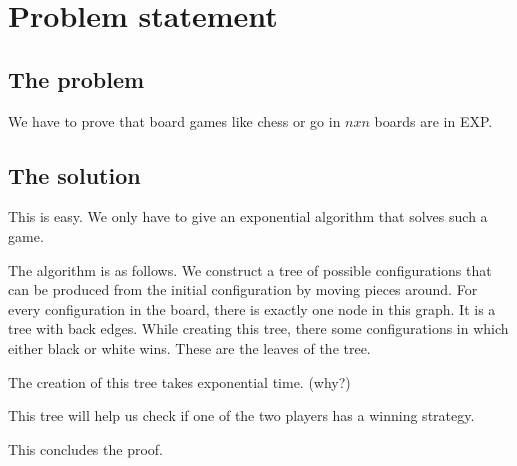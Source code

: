 \section*{Problem statement}
\subsection*{The problem}

We have to prove that board games like chess or go in $nxn$ boards are in EXP.

\subsection*{The solution}

This is easy. We only have to give an exponential algorithm that solves such a 
game. 

The algorithm is as follows. We construct a tree of possible configurations
that can be produced from the initial configuration by moving pieces around. 
For every configuration in the board, there is exactly one node in this graph. 
It is a tree with back edges. While creating this tree, there some 
configurations in which either black or white wins. These are the leaves of 
the tree. 

The creation of this tree takes exponential time. (why?)

This tree will help us check if one of the two players has a winning strategy.

This concludes the proof.
